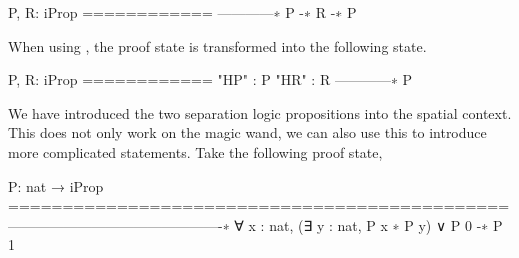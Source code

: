 \documentclass[thesis.tex]{subfiles}
\begin{document}
\begin{coqcode}
  P, R: iProp
  ============
  ------------∗
  P -∗ R -∗ P
\end{coqcode}
When using , the proof state is transformed into the following state.
\begin{coqcode}
  P, R: iProp
  ============
  "HP" : P
  "HR" : R
  ------------∗
  P
\end{coqcode}
We have introduced the two separation logic propositions into the spatial context. This does not only work on the magic wand, we can also use this to introduce more complicated statements. Take the following proof state,
\begin{coqcode}
  P: nat → iProp
  ==============================================
  ----------------------------------------------∗
  ∀ x : nat, (∃ y : nat, P x ∗ P y) ∨ P 0 -∗ P 1
\end{coqcode}
\end{document}
